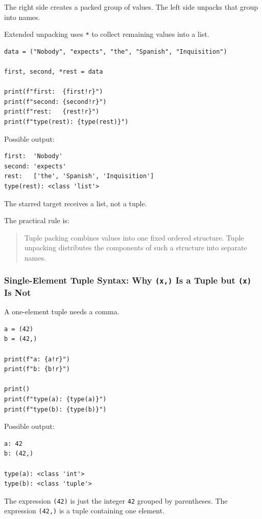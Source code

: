 The right side creates a packed group of values. The left side unpacks that group into names.

Extended unpacking uses \texttt{*} to collect remaining values into a list.

\begin{verbatim}
data = ("Nobody", "expects", "the", "Spanish", "Inquisition")

first, second, *rest = data

print(f"first:  {first!r}")
print(f"second: {second!r}")
print(f"rest:   {rest!r}")
print(f"type(rest): {type(rest)}")
\end{verbatim}

Possible output:

\begin{verbatim}
first:  'Nobody'
second: 'expects'
rest:   ['the', 'Spanish', 'Inquisition']
type(rest): <class 'list'>
\end{verbatim}

The starred target receives a list, not a tuple.

The practical rule is:

\begin{quote}
Tuple packing combines values into one fixed ordered structure. Tuple unpacking distributes the components of such a structure into separate names.
\end{quote}

\subsubsection{Single-Element Tuple Syntax: Why \texttt{(x,)} Is a Tuple but \texttt{(x)} Is Not}

A one-element tuple needs a comma.

\begin{verbatim}
a = (42)
b = (42,)

print(f"a: {a!r}")
print(f"b: {b!r}")

print()
print(f"type(a): {type(a)}")
print(f"type(b): {type(b)}")
\end{verbatim}

Possible output:

\begin{verbatim}
a: 42
b: (42,)

type(a): <class 'int'>
type(b): <class 'tuple'>
\end{verbatim}

The expression \texttt{(42)} is just the integer \texttt{42} grouped by parentheses. The expression \texttt{(42,)} is a tuple containing one element.

